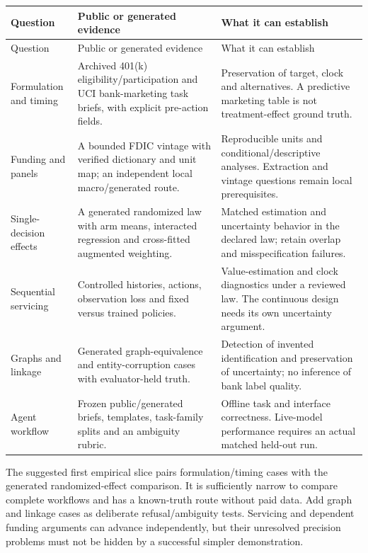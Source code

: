 \begin{longtable}{@{}p{.22\linewidth}p{.36\linewidth}p{.34\linewidth}@{}}
\toprule
Question & Public or generated evidence & What it can establish \\
\midrule
\endfirsthead
\toprule
Question & Public or generated evidence & What it can establish \\
\midrule
\endhead
Formulation and timing & Archived 401(k) eligibility/participation and UCI bank-marketing task briefs, with explicit pre-action fields. & Preservation of target, clock and alternatives. A predictive marketing table is not treatment-effect ground truth. \\
Funding and panels & A bounded FDIC vintage with verified dictionary and unit map; an independent local macro/generated route. & Reproducible units and conditional/descriptive analyses. Extraction and vintage questions remain local prerequisites. \\
Single-decision effects & A generated randomized law with arm means, interacted regression and cross-fitted augmented weighting. & Matched estimation and uncertainty behavior in the declared law; retain overlap and misspecification failures. \\
Sequential servicing & Controlled histories, actions, observation loss and fixed versus trained policies. & Value-estimation and clock diagnostics under a reviewed law. The continuous design needs its own uncertainty argument. \\
Graphs and linkage & Generated graph-equivalence and entity-corruption cases with evaluator-held truth. & Detection of invented identification and preservation of uncertainty; no inference of bank label quality. \\
Agent workflow & Frozen public/generated briefs, templates, task-family splits and an ambiguity rubric. & Offline task and interface correctness. Live-model performance requires an actual matched held-out run. \\
\bottomrule
\end{longtable}

The suggested first empirical slice pairs formulation/timing cases with
the generated randomized-effect comparison. It is sufficiently narrow to
compare complete workflows and has a known-truth route without paid
data. Add graph and linkage cases as deliberate refusal/ambiguity tests.
Servicing and dependent funding arguments can advance independently, but
their unresolved precision problems must not be hidden by a successful
simpler demonstration.

